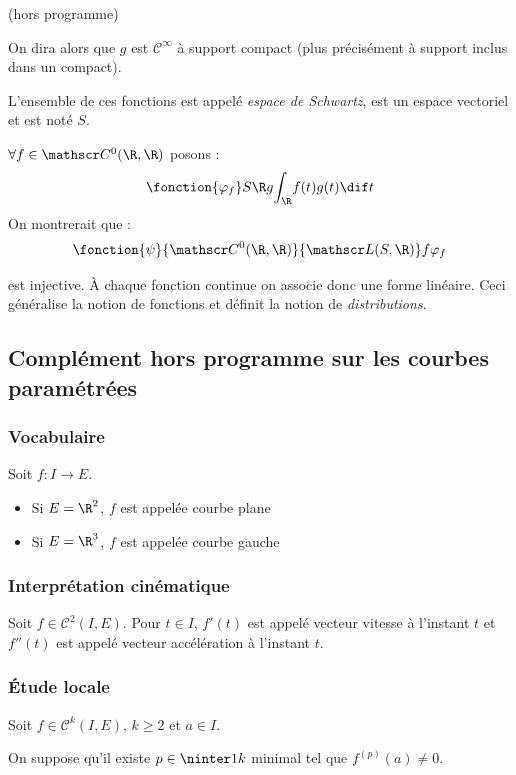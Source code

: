 \begin{remarque}
    (hors programme)
    
    On dira alors que $g$ est $\mathscr C^{\infty}$ à support compact (plus précisément à support inclus dans un compact).

    L'ensemble de ces fonctions est appelé \emph{espace de Schwartz}, est un espace vectoriel et est noté $S$.

    $\forall f \in \mathscr C^0(\R, \R)$ posons :
    \[\fonction {\varphi_f} S {\R} g {\int_{\R}} f(t)g(t) \dif t\]
    On montrerait que :
    \[\fonction {\psi} {\mathscr C^0(\R,\R)} {\mathscr L(S,\R)} f {\varphi_f}\]

    est injective.
    À chaque fonction continue on associe donc une forme linéaire.
    Ceci généralise la notion de fonctions et définit la notion de \emph{distributions}.
\end{remarque}

\subsection{Complément hors programme sur les courbes paramétrées}

\subsubsection{Vocabulaire}
Soit $f : I \to E$.
\begin{itemize}
    \item Si $E = \R^2$, $f$ est appelée courbe plane
    \item Si $E = \R^3$, $f$ est appelée courbe gauche
\end{itemize}

\subsubsection{Interprétation cinématique}
Soit $f \in \mathscr C^2(I, E)$. 
Pour $t \in I$, $f'(t)$ est appelé vecteur vitesse à l'instant $t$ et $f''(t)$ est appelé vecteur accélération à l'instant $t$.

\subsubsection{Étude locale}
Soit $f \in \mathscr C^k(I, E), \, k \geqslant 2$ et $a \in I$. 

On suppose qu'il existe $p \in \ninter 1 k$ minimal tel que $f^{(p)}(a) \neq 0$.

